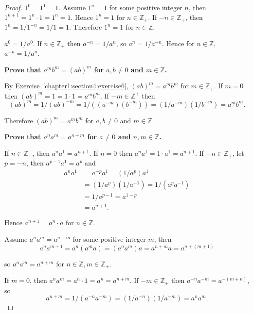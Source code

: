 \begin{proof}
    $1^{0} = 1^{1} = 1$. Assume $1^{n} = 1$ for some positive integer $n$, then $1^{n+1} = 1^{n}\cdot 1 = 1^{n} = 1$. Hence $1^{n} = 1$ for $n\in\mathbb{Z}_{+}$. If $-n\in\mathbb{Z}_{+}$, then $1^{n} = 1/1^{-n} = 1/1 = 1$. Therefore $1^{n} = 1$ for $n\in\mathbb{Z}$.

    $a^{0} = 1/a^{0}$. If $n\in\mathbb{Z}_{+}$ then $a^{-n} = 1/a^{n}$, so $a^{n} = 1/a^{-n}$. Hence for $n\in\mathbb{Z}$, $a^{-n} = 1/a^{n}$.

    \bigskip
    \textbf{Prove that $a^{m}b^{m} = {(ab)}^{m}$ for $a, b\ne 0$ and $m\in\mathbb{Z}$.}

    By Exercise~\ref{chapter1:section4:exercise6}, ${(ab)}^{m} = a^{m}b^{m}$ for $m\in\mathbb{Z}_{+}$. If $m = 0$ then ${(ab)}^{m} = 1 = 1\cdot 1 = a^{m}b^{m}$. If $-m\in\mathbb{Z}^{+}$ then
    \[
        {(ab)}^{m} = 1/{(ab)}^{-m} = 1/((a^{-m})(b^{-m})) = (1/a^{-m})(1/b^{-m}) = a^{m}b^{m}.
    \]

    Therefore ${(ab)}^{m} = a^{m}b^{m}$ for $a, b\ne 0$ and $m\in\mathbb{Z}$.

    \bigskip
    \textbf{Prove that $a^{n}a^{m} = a^{n+m}$ for $a\ne 0$ and $n, m\in\mathbb{Z}$.}

    If $n\in\mathbb{Z}_{+}$, then $a^{n}a^{1} = a^{n+1}$. If $n = 0$ then $a^{n}a^{1} = 1\cdot a^{1} = a^{n+1}$. If $-n\in\mathbb{Z}_{+}$, let $p = -n$, then $a^{p-1}a^{1} = a^{p}$ and
    \begin{align*}
        a^{n}a^{1} & = a^{-p}a^{1} = (1/a^{p})a^{1}          \\
                   & = (1/a^{p})(1/a^{-1}) = 1/(a^{p}a^{-1}) \\
                   & = 1/a^{p-1} = a^{1-p}                   \\
                   & = a^{n+1}.
    \end{align*}

    Hence $a^{n+1} = a^{n}\cdot a$ for $n\in\mathbb{Z}$.

    Assume $a^{n}a^{m} = a^{n+m}$ for some positive integer $m$, then
    \[
        a^{n}a^{m+1} = a^{n}(a^{m}a) = (a^{n}a^{m})a = a^{n+m}a = a^{n+(m+1)}
    \]

    so $a^{n}a^{m} = a^{n+m}$ for $n\in\mathbb{Z}, m\in\mathbb{Z}_{+}$.

    If $m = 0$, then $a^{n}a^{m} = a^{n}\cdot 1 = a^{n} = a^{n+m}$. If $-m\in\mathbb{Z}_{+}$ then $a^{-n}a^{-m} = a^{-(m+n)}$, so
    \[
        a^{n+m} = 1/(a^{-n}a^{-m}) = (1/a^{-n})(1/a^{-m}) = a^{n}a^{m}.
    \]


\end{proof}
